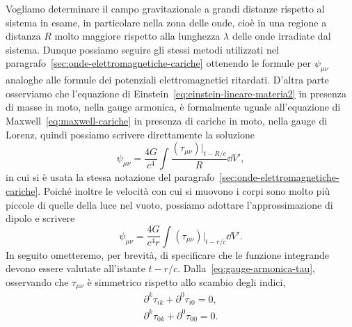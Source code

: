 Vogliamo determinare il campo gravitazionale a grandi distanze rispetto al
sistema in esame, in particolare nella zona delle onde,
cioè in una regione a distanza $R$ molto maggiore rispetto alla lunghezza
$\lambda$ delle onde irradiate dal sistema.  Dunque possiamo seguire gli stessi
metodi utilizzati nel paragrafo~\ref{sec:onde-elettromagnetiche-cariche}
ottenendo le formule per $\psi_{\mu\nu}$ analoghe alle formule dei potenziali
elettromagnetici ritardati.  D'altra parte osserviamo che l'equazione di
Einstein~\eqref{eq:einstein-lineare-materia2} in presenza di masse in moto,
nella gauge armonica, è formalmente uguale all'equazione di
Maxwell~\eqref{eq:maxwell-cariche} in presenza di cariche in moto, nella gauge
di Lorenz, quindi possiamo scrivere direttamente la soluzione
\begin{equation}
  \psi_{\mu\nu} = \frac{4G}{c^{4}}\int \frac{(\tau_{\mu\nu})|_{t - R/c}}{R} \dd
  V',
\end{equation}
in cui si è usata la stessa notazione del
paragrafo~\ref{sec:onde-elettromagnetiche-cariche}.  Poiché inoltre le velocità
con cui si muovono i corpi sono molto più piccole di quelle della luce nel
vuoto, possiamo adottare l'approssimazione di dipolo e scrivere
\begin{equation}
  \label{eq:psi-mu-nu}
  \psi_{\mu\nu} = \frac{4G}{c^{4}r} \int(\tau_{\mu\nu})|_{t-r/c} \dd V'.
\end{equation}
In seguito ometteremo, per brevità, di specificare che le funzione integrande
devono essere valutate all'istante $t-r/c$.
Dalla~\eqref{eq:gauge-armonica-tau}, osservando che $\tau_{\mu\nu}$ è simmetrico
rispetto allo scambio degli indici,
\begin{subequations}
  \begin{align}
    \label{eq:baz1}
    \partial^{k}\tau_{ik} + \partial^{0}\tau_{i0} = 0, \\
    \label{eq:baz2}
    \partial^{k}\tau_{0k} + \partial^{0}\tau_{00} = 0.
  \end{align}
\end{subequations}
